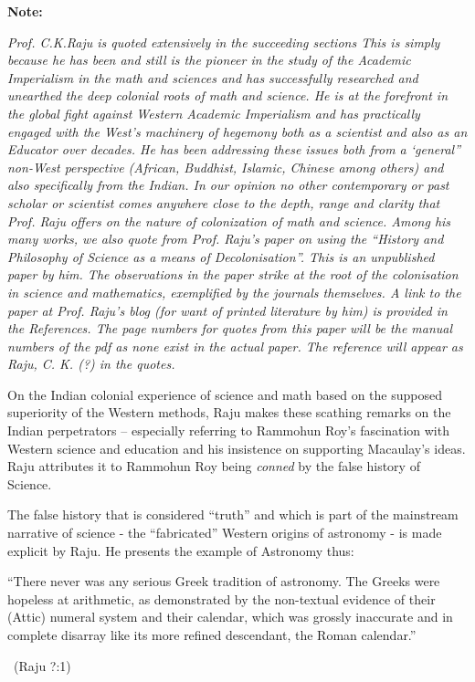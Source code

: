 \vskip 4pt

\textbf{Note:}

\vskip 4pt

\textit{Prof. C.K.Raju is quoted extensively in the succeeding sections This is simply because he has been and still is the pioneer in the study of the Academic Imperialism in the math and sciences and has successfully researched and unearthed the deep colonial roots of math and science. He is at the forefront in the global fight against Western Academic Imperialism and has practically engaged with the West’s machinery of hegemony both as a scientist and also as an Educator over decades. He has been addressing these issues both from a ‘general” non-West perspective (African, Buddhist, Islamic, Chinese among others) and also specifically from the Indian. In our opinion no other contemporary or past scholar or scientist comes anywhere close to the depth, range and clarity that Prof. Raju offers on the nature of colonization of math and science. Among his many works, we also quote from Prof. Raju’s paper on using the “History and Philosophy of Science as a means of Decolonisation”. This is an unpublished paper by him. The observations in the paper strike at the root of the colonisation in science and mathematics, exemplified by the journals themselves. A link to the paper at Prof. Raju’s blog (for want of printed literature by him) is provided in the References. The page numbers for quotes from this paper will be the manual numbers of the pdf as none exist in the actual paper. The reference will appear as Raju, C. K. (?) in the quotes.}

\vskip 3pt

On the Indian colonial experience of science and math based on the supposed superiority of the Western methods, Raju makes these scathing remarks on the Indian perpetrators – especially referring to Rammohun Roy’s fascination with Western science and education and his insistence on supporting Macaulay’s ideas. Raju attributes it to Rammohun Roy being \textit{conned} by the false history of Science.

The false history that is considered “truth” and which is part of the mainstream narrative of science - the “fabricated” Western origins of astronomy - is made explicit by Raju. He presents the example of Astronomy thus:

\begin{myquote}
“There never was any serious Greek tradition of astronomy. The Greeks were hopeless at arithmetic, as demonstrated by the non-textual evidence of their (Attic) numeral system and their calendar, which was grossly inaccurate and in complete disarray like its more refined descendant, the Roman calendar.” 

\vskip -6pt

~\hfill (Raju ?:1)
\end{myquote}

